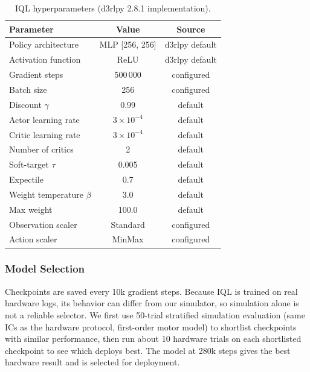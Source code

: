 \begin{table}[!t]
\centering
\renewcommand{\arraystretch}{1.15}
\caption{IQL hyperparameters (d3rlpy 2.8.1 implementation).}
\label{tab:iql_hyperparams}
\begin{tabular}{lcc}
\toprule
\textbf{Parameter} & \textbf{Value} & \textbf{Source} \\
\midrule
Policy architecture      & MLP [256, 256]   & d3rlpy default \\
Activation function      & ReLU             & d3rlpy default \\
Gradient steps           & 500\,000         & configured     \\
Batch size               & 256              & configured     \\
Discount $\gamma$        & 0.99             & default        \\
Actor learning rate      & $3{\times}10^{-4}$ & default      \\
Critic learning rate     & $3{\times}10^{-4}$ & default      \\
Number of critics        & 2                & default        \\
Soft-target $\tau$       & 0.005            & default        \\
Expectile                & 0.7              & default        \\
Weight temperature $\beta$ & 3.0            & default        \\
Max weight               & 100.0            & default        \\
Observation scaler       & Standard         & configured     \\
Action scaler            & MinMax           & configured     \\
\bottomrule
\end{tabular}
\end{table}

\subsubsection{Model Selection}

Checkpoints are saved every 10k gradient steps.
Because IQL is trained on real hardware logs, its behavior can differ
from our simulator, so simulation alone is not a reliable selector. We
first use 50-trial stratified simulation evaluation (same ICs as the
hardware protocol, first-order motor model) to shortlist checkpoints with
similar performance, then run about 10 hardware trials on each shortlisted
checkpoint to see which deploys best. The model at 280k steps gives the
best hardware result and is selected for deployment.

